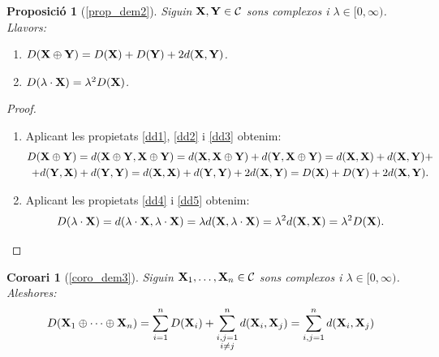 \documentclass{article}
\theoremstyle{math}
\theoremstyle{TheoremNum}
\newtheorem{prop*}[definition]{Proposició}
\newtheorem{corollary*}[definition]{Coro\lgem ari}
\newcommand{\0}{\ensuremath{\vb{0}}}
\newcommand{\X}{\ensuremath{\vb{X}}}
\newcommand{\Y}{\ensuremath{\vb{Y}}}
\begin{document}
\begin{prop*}[\ref*{prop_dem2}]
    Siguin $\X,\Y\in\mathcal{C}$ sons complexos i $\lambda\in[0,\infty)$. Llavors:
    \begin{enumerate}[label=$D$\arabic*),ref=$D$\arabic*]
        \item\label{DD1} $D(\X\oplus\Y)=D(\X)+D(\Y)+2d(\X,\Y)$.
        \item\label{DD2} $D(\lambda\cdot \X)=\lambda^2D(\X)$.
    \end{enumerate}
\end{prop*}
\begin{proof}
    \hfill
    \begin{enumerate}[label=$D$\arabic*)]
        \item Aplicant les propietats \ref{dd1}, \ref{dd2} i \ref{dd3} obtenim:
        \begin{multline*}
            D(\X\oplus\Y)=d(\X\oplus\Y,\X\oplus\Y)=d(\X,\X\oplus\Y)+d(\Y,\X\oplus\Y)=d(\X,\X)+d(\X,\Y)+\\+d(\Y,\X)+d(\Y,\Y)=d(\X,\X)+d(\Y,\Y)+2d(\X,\Y)=D(\X)+D(\Y)+2d(\X,\Y).
        \end{multline*}
        \item Aplicant les propietats \ref{dd4} i \ref{dd5} obtenim: $$D(\lambda\cdot\X)=d(\lambda\cdot\X,\lambda\cdot\X)=\lambda d(\X,\lambda\cdot\X)=\lambda^2d(\X,\X)=\lambda^2D(\X).$$
    \end{enumerate}
\end{proof}
\begin{corollary*}[\ref*{coro_dem3}]
    Siguin $\X_1,\ldots,\X_n\in\mathcal{C}$ sons complexos i $\lambda\in[0,\infty)$. Aleshores: $$D(\X_1\oplus\cdots\oplus\X_n)=\sum_{i=1}^nD(\X_i)+\sum_{\substack{i,j=1\\i\ne j}}^nd(\X_i,\X_j)=\sum_{i,j=1}^nd(\X_i,\X_j)$$
\end{corollary*}
\end{document}

